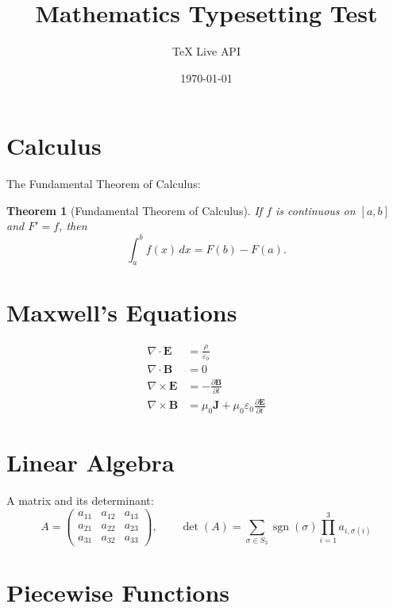 \documentclass[12pt]{article}
\title{Mathematics Typesetting Test}
\author{TeX Live API}
\date{\today}
\theoremstyle{plain}
\newtheorem{theorem}{Theorem}
\theoremstyle{definition}
\begin{document}
\maketitle

\section{Calculus}

The Fundamental Theorem of Calculus:

\begin{theorem}[Fundamental Theorem of Calculus]
  If $f$ is continuous on $[a,b]$ and $F' = f$, then
  \begin{equation}
    \int_a^b f(x)\,dx = F(b) - F(a). \label{eq:ftc}
  \end{equation}
\end{theorem}

\section{Maxwell's Equations}

\begin{align}
  \nabla \cdot \mathbf{E}  &= \frac{\rho}{\varepsilon_0}           \label{eq:gauss_e} \\
  \nabla \cdot \mathbf{B}  &= 0                                     \label{eq:gauss_b} \\
  \nabla \times \mathbf{E} &= -\frac{\partial \mathbf{B}}{\partial t} \label{eq:faraday} \\
  \nabla \times \mathbf{B} &= \mu_0 \mathbf{J} + \mu_0 \varepsilon_0 \frac{\partial \mathbf{E}}{\partial t} \label{eq:ampere}
\end{align}

\section{Linear Algebra}

A matrix and its determinant:
\begin{equation}
  A = \begin{pmatrix} a_{11} & a_{12} & a_{13} \\ a_{21} & a_{22} & a_{23} \\ a_{31} & a_{32} & a_{33} \end{pmatrix}, \qquad
  \det(A) = \sum_{\sigma \in S_3} \operatorname{sgn}(\sigma) \prod_{i=1}^{3} a_{i,\sigma(i)}
\end{equation}

\section{Piecewise Functions}
\end{document}
